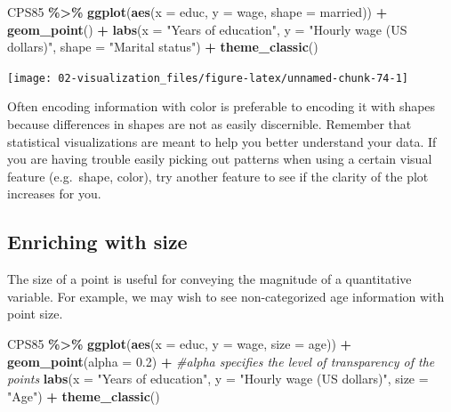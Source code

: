 \documentclass[
]{book}
\newenvironment{Shaded}{\begin{snugshade}}{\end{snugshade}}
\newcommand{\AttributeTok}[1]{\textcolor[rgb]{0.13,0.29,0.53}{#1}}
\newcommand{\CommentTok}[1]{\textcolor[rgb]{0.56,0.35,0.01}{\textit{#1}}}
\newcommand{\FloatTok}[1]{\textcolor[rgb]{0.00,0.00,0.81}{#1}}
\newcommand{\FunctionTok}[1]{\textcolor[rgb]{0.13,0.29,0.53}{\textbf{#1}}}
\newcommand{\NormalTok}[1]{#1}
\newcommand{\SpecialCharTok}[1]{\textcolor[rgb]{0.81,0.36,0.00}{\textbf{#1}}}
\newcommand{\StringTok}[1]{\textcolor[rgb]{0.31,0.60,0.02}{#1}}
\begin{document}
\begin{Shaded}
\begin{Highlighting}[]
\NormalTok{CPS85 }\SpecialCharTok{\%\textgreater{}\%}
    \FunctionTok{ggplot}\NormalTok{(}\FunctionTok{aes}\NormalTok{(}\AttributeTok{x =}\NormalTok{ educ, }\AttributeTok{y =}\NormalTok{ wage, }\AttributeTok{shape =}\NormalTok{ married)) }\SpecialCharTok{+}
    \FunctionTok{geom\_point}\NormalTok{() }\SpecialCharTok{+}
    \FunctionTok{labs}\NormalTok{(}\AttributeTok{x =} \StringTok{"Years of education"}\NormalTok{, }\AttributeTok{y =} \StringTok{"Hourly wage (US dollars)"}\NormalTok{, }\AttributeTok{shape =} \StringTok{"Marital status"}\NormalTok{) }\SpecialCharTok{+}
    \FunctionTok{theme\_classic}\NormalTok{()}
\end{Highlighting}
\end{Shaded}

\begin{center}\texttt{[image: 02-visualization\_files/figure-latex/unnamed-chunk-74-1]} \end{center}

Often encoding information with color is preferable to encoding it with shapes because differences in shapes are not as easily discernible. Remember that statistical visualizations are meant to help you better understand your data. If you are having trouble easily picking out patterns when using a certain visual feature (e.g.~shape, color), try another feature to see if the clarity of the plot increases for you.

\subsection{Enriching with size}\label{enriching-with-size}

The size of a point is useful for conveying the magnitude of a quantitative variable. For example, we may wish to see non-categorized age information with point size.

\begin{Shaded}
\begin{Highlighting}[]
\NormalTok{CPS85 }\SpecialCharTok{\%\textgreater{}\%}
    \FunctionTok{ggplot}\NormalTok{(}\FunctionTok{aes}\NormalTok{(}\AttributeTok{x =}\NormalTok{ educ, }\AttributeTok{y =}\NormalTok{ wage, }\AttributeTok{size =}\NormalTok{ age)) }\SpecialCharTok{+}
    \FunctionTok{geom\_point}\NormalTok{(}\AttributeTok{alpha =} \FloatTok{0.2}\NormalTok{) }\SpecialCharTok{+} \CommentTok{\#alpha specifies the level of transparency of the points}
    \FunctionTok{labs}\NormalTok{(}\AttributeTok{x =} \StringTok{"Years of education"}\NormalTok{, }\AttributeTok{y =} \StringTok{"Hourly wage (US dollars)"}\NormalTok{, }\AttributeTok{size =} \StringTok{"Age"}\NormalTok{) }\SpecialCharTok{+}
    \FunctionTok{theme\_classic}\NormalTok{()}
\end{Highlighting}
\end{Shaded}
\end{document}
